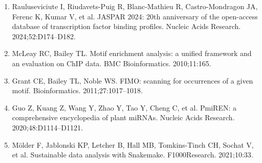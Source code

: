 \documentclass[11pt]{article}
\begin{document}
\begin{enumerate}[itemsep=1pt,leftmargin=1.6em]
\item Rauluseviciute I, Riudavets-Puig R, Blanc-Mathieu R, Castro-Mondragon JA, Ferenc K, Kumar V, et al. JASPAR 2024: 20th anniversary of the open-access database of transcription factor binding profiles. Nucleic Acids Research. 2024;52:D174--D182.
\item McLeay RC, Bailey TL. Motif enrichment analysis: a unified framework and an evaluation on ChIP data. BMC Bioinformatics. 2010;11:165.
\item Grant CE, Bailey TL, Noble WS. FIMO: scanning for occurrences of a given motif. Bioinformatics. 2011;27:1017--1018.
\item Guo Z, Kuang Z, Wang Y, Zhao Y, Tao Y, Cheng C, et al. PmiREN: a comprehensive encyclopedia of plant miRNAs. Nucleic Acids Research. 2020;48:D1114--D1121.
\item M\"older F, Jablonski KP, Letcher B, Hall MB, Tomkins-Tinch CH, Sochat V, et al. Sustainable data analysis with Snakemake. F1000Research. 2021;10:33.
\end{enumerate}
\end{document}
